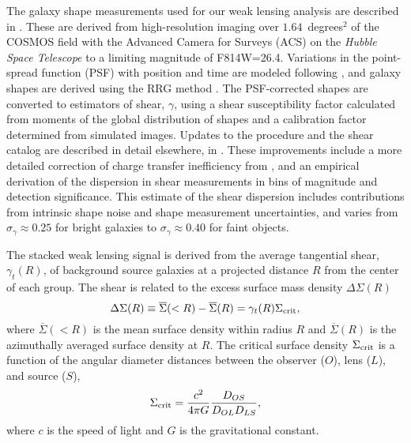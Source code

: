 \documentclass[12pt]{emulateapj}
\begin{document}
The galaxy shape measurements used for our weak lensing analysis are
described in \citet{Leauthaud2007}. These are derived from
high-resolution imaging over $1.64$~degrees$^2$ of the COSMOS field
with the Advanced Camera for Surveys (ACS) on the \textit{Hubble Space
  Telescope} \citep[\textit{HST};][]{Koekemoer2007} to a limiting magnitude of
F814W=26.4.  Variations in the point-spread function (PSF) with
position and time are modeled following \citet{Rhodes2007}, and galaxy
shapes are derived using the RRG method \citep{Rhodes2000}. The
PSF-corrected shapes are converted to estimators of shear, $\gamma$,
using a shear susceptibility factor calculated from moments of the
global distribution of shapes and a calibration factor determined from
simulated images. Updates to the procedure and the shear catalog are
described in detail elsewhere, in \citet{Leauthaud2012}. These improvements include a more
detailed correction of charge transfer inefficiency from
\citet{Massey2010}, and an empirical derivation of the dispersion in
shear measurements in bins of magnitude and detection
significance. This estimate of the shear dispersion includes
contributions from intrinsic shape noise and shape measurement
uncertainties, and varies from $\sigma_{\gamma}\approx 0.25$ for
bright galaxies to $\sigma_{\gamma}\approx 0.40$ for faint objects.

The stacked weak lensing signal is derived from the average
tangential shear, $\gamma_t(R)$, of background source galaxies at a
projected distance $R$ from the center of each group. The shear is related to
the excess surface mass density $\Delta\Sigma(R)$ \citep{Miralda1991}
\begin{equation}
\Delta\Sigma(R) \equiv \overline{\Sigma}(<R) - \overline{\Sigma}(R) =
\gamma_t(R)\Sigma_{\rm crit},
\label{eq:ds_def}
\end{equation}
where $\overline{\Sigma}(<R)$ is the mean surface density within
radius $R$ and $\overline{\Sigma}(R)$ is the azimuthally averaged
surface density at $R$. The critical surface density $\Sigma_{\rm
  crit}$ is a function of the angular diameter distances between the
observer ($O$), lens ($L$), and source ($S$),
\begin{equation}
\Sigma_{\rm crit}=\frac{c^2}{4\pi G}\frac{D_{OS}}{D_{OL}D_{LS}},
\label{eq:sigma_crit}
\end{equation}
where $c$ is the speed of light and $G$ is the gravitational constant.
\end{document}
